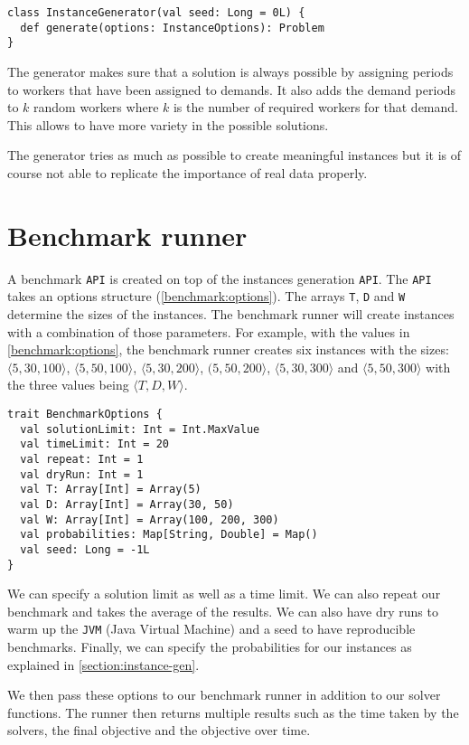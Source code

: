 \documentclass[../thesis.tex]{subfiles}
\begin{document}
  
\begin{lstlisting}[style=scalaStyle,caption={Instance generator \texttt{API}},captionpos=b]
class InstanceGenerator(val seed: Long = 0L) {
  def generate(options: InstanceOptions): Problem
}
\end{lstlisting}

The generator makes sure that a solution is always possible by assigning periods to workers 
that have been assigned to demands. It also adds the demand periods to $k$ random workers
where $k$ is the number of required workers for that demand. 
This allows to have more variety in the possible solutions.
    
The generator tries as much as possible to create meaningful instances but it is of course not able to replicate the importance of real data properly.

\section{Benchmark runner}
\label{section:benchmark-runner}

A benchmark \texttt{API} is created on top of the instances generation \texttt{API}. The \texttt{API} takes an options structure (\autoref{benchmark:options}).
The arrays \texttt{T}, \texttt{D} and \texttt{W} determine the sizes of the instances. The benchmark runner 
will create instances with a combination of those parameters. For example, with the values in \autoref{benchmark:options},
the benchmark runner creates six instances with the sizes: $\langle5, 30, 100\rangle$, $\langle5, 50, 100\rangle$, $\langle5, 30, 200\rangle$, $(5, 50, 200\rangle$, $\langle5, 30, 300\rangle$ and $\langle5, 50, 300\rangle$ with the 
three values being $\langle T, D, W\rangle$.

\begin{lstlisting}[style=scalaStyle,label={benchmark:options},caption={Benchmark options},captionpos=b]
trait BenchmarkOptions {
  val solutionLimit: Int = Int.MaxValue
  val timeLimit: Int = 20
  val repeat: Int = 1
  val dryRun: Int = 1
  val T: Array[Int] = Array(5)
  val D: Array[Int] = Array(30, 50)
  val W: Array[Int] = Array(100, 200, 300)
  val probabilities: Map[String, Double] = Map()
  val seed: Long = -1L
}
\end{lstlisting}

We can specify a solution limit as well as a time limit. We can also repeat our benchmark and takes 
the average of the results. We can also have dry runs to warm up the \texttt{JVM} (Java Virtual Machine) and a seed to have reproducible benchmarks. Finally,
we can specify the probabilities for our instances as explained in \autoref{section:instance-gen}.

We then pass these options to our benchmark runner in addition to our solver functions. The runner then returns 
multiple results such as the time taken by the solvers, the final objective and the objective over time.
\end{document}
